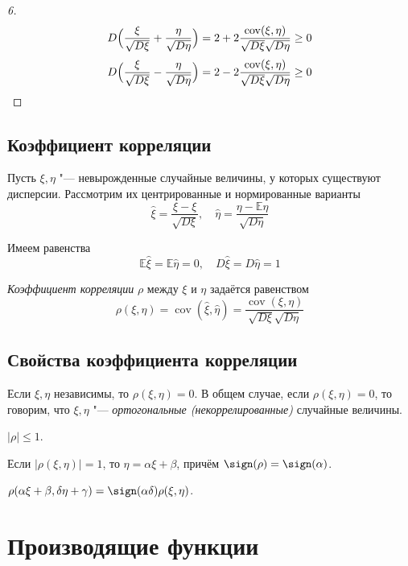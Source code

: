 \begin{proof}[6]
	$$ D \Bigl( \frac\xi{\sqrt{D\xi}} + \frac\eta{\sqrt{D\eta}} \Bigr) =
	2 + 2 \frac{\operatorname{cov}(\xi, \eta)}{\sqrt{D\xi} \sqrt{D\eta}} \ge 0 $$
	$$ D \Bigl( \frac\xi{\sqrt{D\xi}} - \frac\eta{\sqrt{D\eta}} \Bigr) =
	2 - 2 \frac{\operatorname{cov}(\xi, \eta)}{\sqrt{D\xi} \sqrt{D \eta}} \ge 0 $$
\end{proof}

\subsection{Коэффициент корреляции}

Пусть $ \xi, \eta $ "--- невырожденные случайные величины, у которых существуют дисперсии.
Рассмотрим их центрированные и нормированные варианты
$$ \hat\xi = \frac{\xi - \mathbb \xi}{\sqrt{D \xi}}, \quad \hat \eta =
\frac{\eta - \mathbb E \eta}{\sqrt{D \eta}} $$

Имеем равенства
$$ \mathbb E \hat \xi = \mathbb E \hat \eta = 0, \quad D \hat \xi = D \hat \eta = 1 $$

\begin{definition}
	\emph{Коэффициент корреляции} $ \rho $ между $ \xi $ и $ \eta $ задаётся равенством
	$$ \rho(\xi, \eta) = \operatorname{cov}(\hat \xi, \hat \eta) =
	\frac{\operatorname{cov}(\xi, \eta)}{\sqrt{D \xi} \sqrt{D \eta}} $$
\end{definition}

\subsection{Свойства коэффициента корреляции}

\begin{props}
\item Если $ \xi, \eta $ независимы, то $ \rho(\xi, \eta) = 0 $.
	В общем случае, если $ \rho(\xi, \eta) = 0 $, то говорим, что $ \xi, \eta $ "---
	\emph{ортогональные (некоррелированные)} случайные величины.
\item $ |\rho| \le 1 $.
\item Если $ |\rho(\xi, \eta)| = 1 $, то $ \eta = \alpha\xi + \beta $, причём
	$ \sign(\rho) = \sign(\alpha) $.
\item $ \rho(\alpha \xi + \beta, \delta \eta + \gamma) = \sign(\alpha \delta) \rho(\xi, \eta) $.
\end{props}

\section{Производящие функции}

